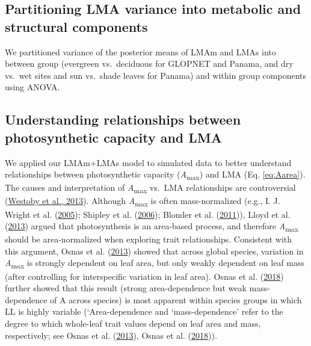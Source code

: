 \documentclass[
  12pt,
  a4paper,
,tablecaptionabove
]{scrartcl}
\begin{document}
\hypertarget{partitioning-lma-variance-into-metabolic-and-structural-components}{%
\subsection{Partitioning LMA variance into metabolic and structural
components}\label{partitioning-lma-variance-into-metabolic-and-structural-components}}

We partitioned variance of the posterior means of LMAm and LMAs into
between group (evergreen vs.~deciduous for GLOPNET and Panama, and dry
vs.~wet sites and sun vs.~shade leaves for Panama) and within group
components using ANOVA.

\hypertarget{understanding-relationships-between-photosynthetic-capacity-and-lma}{%
\subsection{Understanding relationships between photosynthetic capacity
and
LMA}\label{understanding-relationships-between-photosynthetic-capacity-and-lma}}

We applied our LMAm+LMAs model to simulated data to better understand
relationships between photosynthetic capacity
(\emph{A}\textsubscript{max}) and LMA (Eq. \ref{eq:Aarea}). The causes
and interpretation of \emph{A}\textsubscript{max} vs.~LMA relationships
are controversial (\protect\hyperlink{ref-Westoby2013}{Westoby et al.,
2013}). Although \emph{A}\textsubscript{max} is often mass-normalized
(e.g., I. J. Wright et al. (\protect\hyperlink{ref-Wright2005}{2005});
Shipley et al. (\protect\hyperlink{ref-Shipley2006}{2006}); Blonder et
al. (\protect\hyperlink{ref-Blonder2011}{2011})), Lloyd et al.
(\protect\hyperlink{ref-Lloyd2013}{2013}) argued that photosynthesis is
an area-based process, and therefore \emph{A}\textsubscript{max} should
be area-normalized when exploring trait relationships. Consistent with
this argument, Osnas et al. (\protect\hyperlink{ref-Osnas2013}{2013})
showed that across global species, variation in
\emph{A}\textsubscript{max} is strongly dependent on leaf area, but only
weakly dependent on leaf mass (after controlling for interspecific
variation in leaf area). Osnas et al.
(\protect\hyperlink{ref-Osnas2018}{2018}) further showed that this
result (strong area-dependence but weak mass-dependence of A across
species) is most apparent within species groups in which LL is highly
variable (`Area-dependence and `mass-dependence' refer to the degree to
which whole-leaf trait values depend on leaf area and mass,
respectively; see Osnas et al.
(\protect\hyperlink{ref-Osnas2013}{2013}), Osnas et al.
(\protect\hyperlink{ref-Osnas2018}{2018})).
\end{document}
